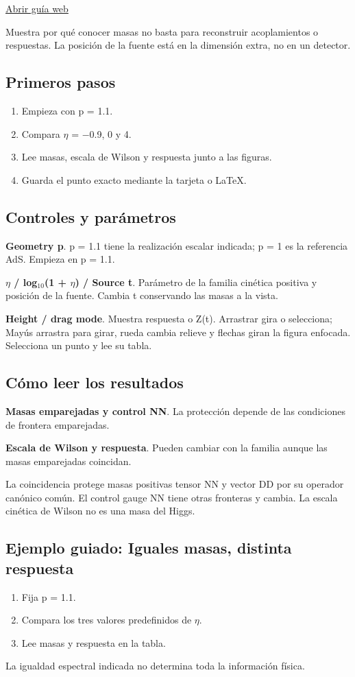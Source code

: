 \documentclass[11pt,a4paper]{article}
\begin{document}
\href{https://karlesmarin.github.io/ghu-explorer/guide/es/gravitygauge/index.html}{Abrir guía web}

Muestra por qué conocer masas no basta para reconstruir acoplamientos o respuestas. La posición de la fuente está en la dimensión extra, no en un detector.
\subsection*{Primeros pasos}
\begin{enumerate}
\item Empieza con p = 1.1.
\item Compara \ensuremath{\eta} = \ensuremath{-}0.9, 0 y 4.
\item Lee masas, escala de Wilson y respuesta junto a las figuras.
\item Guarda el punto exacto mediante la tarjeta o LaTeX.
\end{enumerate}
\subsection*{Controles y parámetros}
\textbf{Geometry p}. p = 1.1 tiene la realización escalar indicada; p = 1 es la referencia AdS. Empieza en p = 1.1.

\textbf{\ensuremath{\eta} / log\ensuremath{{}_{10}}(1 + \ensuremath{\eta}) / Source t}. Parámetro de la familia cinética positiva y posición de la fuente. Cambia t conservando las masas a la vista.

\textbf{Height / drag mode}. Muestra respuesta o Z(t). Arrastrar gira o selecciona; Mayús arrastra para girar, rueda cambia relieve y flechas giran la figura enfocada. Selecciona un punto y lee su tabla.

\subsection*{Cómo leer los resultados}
\textbf{Masas emparejadas y control NN}. La protección depende de las condiciones de frontera emparejadas.

\textbf{Escala de Wilson y respuesta}. Pueden cambiar con la familia aunque las masas emparejadas coincidan.

La coincidencia protege masas positivas tensor NN y vector DD por su operador canónico común. El control gauge NN tiene otras fronteras y cambia. La escala cinética de Wilson no es una masa del Higgs.
\subsection*{Ejemplo guiado: Iguales masas, distinta respuesta}
\begin{enumerate}
\item Fija p = 1.1.
\item Compara los tres valores predefinidos de \ensuremath{\eta}.
\item Lee masas y respuesta en la tabla.
\end{enumerate}
La igualdad espectral indicada no determina toda la información física.
\end{document}
